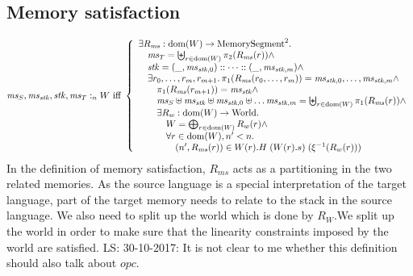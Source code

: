 \documentclass[a3paper]{article}
\newcommand\lau[1]{{\color{purple} \sf \footnotesize {LS: #1}}\\}
\newcommand{\dom}{\mathrm{dom}}
\newcommand{\npair}[2][n]{\left(#1,#2\right)}
\newcommand{\fun}{\rightarrow}
\newcommand{\memSat}[3][n]{#2 :_{#1}#3}
\newcommand{\World}{\mathrm{World}}
\newcommand{\shareddom}[1]{\mathrm{#1}}
\newcommand{\MemSeg}{\shareddom{MemorySegment}}
\newcommand{\var}[1]{\mathit{#1}}
\newcommand{\ms}{\var{ms}}
\newcommand{\stk}{\var{stk}}
\newcommand{\opc}{\var{opc}}
\begin{document}
\subsection{Memory satisfaction}
\[
  \memSat{\ms_S,\ms_\stk,\stk,\ms_T}{W} \text{ iff } 
  \left\{
    \begin{array}{l}
      \exists R_\ms : \dom(W) \fun \MemSeg^2 \ldotp \\
      \quad \ms_T = \biguplus_{r \in \dom(W)} \pi_2(R_\ms(r)) \wedge \\
      \quad \stk = (\_,\ms_{\stk,0}) :: \dots :: (\_,\ms_{\stk,m}) \wedge \\
      \quad \exists r_0 , \dots, r_m, r_{m+1} \ldotp \pi_1(R_\ms(r_0,\dots,r_m)) = \ms_{\stk,0},\dots , \ms_{\stk,m} \wedge \\
      \qquad \pi_1(R_\ms(r_{m+1})) = \ms_\stk \wedge \\
      \qquad \ms_S \uplus \ms_\stk \uplus \ms_{\stk,0} \uplus \dots \ms_{\stk,m} = \biguplus_{r \in \dom(W)} \pi_1(R_\ms(r)) \wedge \\
      \qquad \exists R_w : \dom(W) \fun \World \ldotp\\
      \quad \qquad W = \bigoplus_{r \in \dom(W)} R_w(r) \wedge \\
      \quad \qquad \forall r \in \dom(W) , n' < n \ldotp \\
      \qquad \qquad \npair[n']{R_\ms(r)} \in W(r).H \; (W(r).s) \; (\xi^{-1} (R_w (r))) 
    \end{array}
  \right.
\]
In the definition of memory satisfaction, $R_\ms$ acts as a partitioning in the two related memories. As the source language is a special interpretation of the target language, part of the target memory needs to relate to the stack in the source language. We also need to split up the world which is done by $R_W$.We split up the world in order to make sure that the linearity constraints imposed by the world are satisfied.
\lau{30-10-2017: It is not clear to me whether this definition should also talk about $\opc$.}
\end{document}
